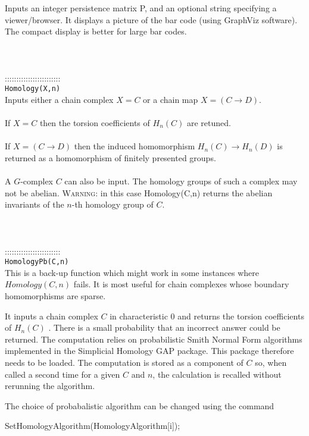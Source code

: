 \documentclass[a4paper,11pt]{report}
\begin{document}
{ Inputs an integer persistence matrix P, and an optional string specifying a
viewer/browser. It displays a picture of the bar code (using GraphViz
software). The compact display is better for large bar codes. \\
 \\
 \\
 \\
 ::::::::::::::::::::::::\\
 \texttt{Homology(X,n)}\\
 

 Inputs either a chain complex $X=C$ or a chain map $X=(C \longrightarrow D)$. \\
 \\
If $X=C$ then the torsion coefficients of $H_n(C)$ are retuned.\\
 \\
 If $X=(C \longrightarrow D)$ then the induced homomorphism $H_n(C) \longrightarrow H_n(D)$ is returned as a homomorphism of finitely presented groups. \\
 \\
 A $G$-complex $C$ can also be input. The homology groups of such a complex may not be abelian. \textsc{Warning:} in this case Homology(C,n) returns the abelian invariants of the $n$-th homology group of $C$. \\
 \\
 \\
 \\
 ::::::::::::::::::::::::\\
 \texttt{HomologyPb(C,n)}\\
 

 This is a back-up function which might work in some instances where $Homology(C,n)$ fails. It is most useful for chain complexes whose boundary homomorphisms are
sparse. 

 It inputs a chain complex $C$ in characteristic $0$ and returns the torsion coefficients of $H_n(C)$ . There is a small probability that an incorrect answer could be returned. The
computation relies on probabilistic Smith Normal Form algorithms implemented
in the Simplicial Homology GAP package. This package therefore needs to be
loaded. The computation is stored as a component of $C$ so, when called a second time for a given $C$ and $n$, the calculation is recalled without rerunning the algorithm. 

 The choice of probabalistic algorithm can be changed using the command 

 SetHomologyAlgorithm(HomologyAlgorithm[i]);

}
\end{document}
